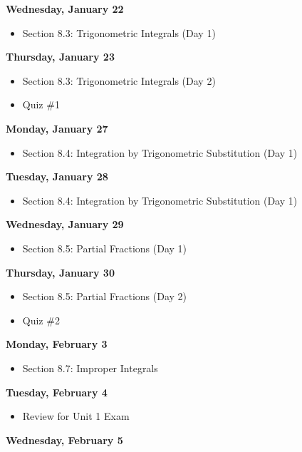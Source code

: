 \documentclass[11pt]{article}
\begin{document}
\textbf{Wednesday, January 22}

\begin{itemize}
\item Section 8.3: Trigonometric Integrals (Day 1)
\end{itemize}

\textbf{Thursday, January 23}

\begin{itemize}
\item Section 8.3: Trigonometric Integrals (Day 2)
\item Quiz \#1
\end{itemize}

\textbf{Monday, January 27}

\begin{itemize}
\item Section 8.4: Integration by Trigonometric Substitution (Day 1)
\end{itemize}

\textbf{Tuesday, January 28}

\begin{itemize}
\item Section 8.4: Integration by Trigonometric Substitution (Day 1)
\end{itemize}

\textbf{Wednesday, January 29}

\begin{itemize}
\item Section 8.5: Partial Fractions (Day 1)
\end{itemize}

\textbf{Thursday, January 30}

\begin{itemize}
\item Section 8.5: Partial Fractions (Day 2)
\item Quiz \#2
\end{itemize}

\textbf{Monday, February 3}

\begin{itemize}
\item Section 8.7: Improper Integrals
\end{itemize}

\textbf{Tuesday, February 4}

\begin{itemize}
\item Review for Unit 1 Exam
\end{itemize}

\textbf{Wednesday, February 5}
\end{document}
